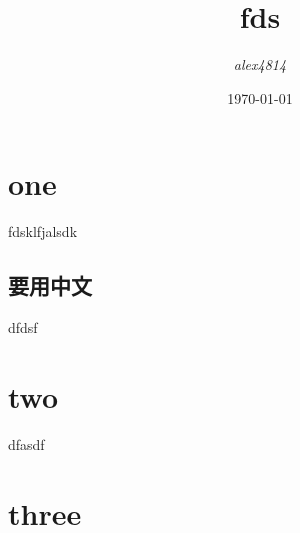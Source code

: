 \documentclass[cs4size]{ctexart}
\begin{document}
\title{\bf fds}
\author{\it alex4814}

\date{\today}
\maketitle

\section{one}

fdsklfjalsdk

\subsection{要用中文}
dfdsf

\section{two}
dfasdf

\section{three}
\end{document}
